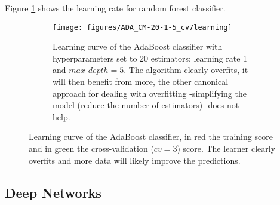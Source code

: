 \documentclass[11pt]{article}
\theoremstyle{definition}
\theoremstyle{remark}
\begin{document}
Figure \ref{fig:rf_learning} shows the learning rate for random forest classifier. 
\begin{figure}[H]
    \centering
    \begin{subfigure}[t]{.8\textwidth}
        \centering
        \texttt{[image: figures/ADA\_CM-20-1-5\_cv7learning]}
        \caption{Learning curve of the AdaBoost classifier with  hyperparameters set to 20 estimators; learning rate 1 and  $max\_depth=5$. The algorithm clearly overfits, it will then benefit from more, the other canonical approach for dealing with overfitting -simplifying the model (reduce the number of estimators)- does not help.}
    \end{subfigure}

    
    \caption{Learning curve of the AdaBoost classifier, in red the training score and in green the cross-validation ($cv=3$) score. The learner clearly overfits and more data will likely improve the predictions.} \label{fig:rf_learning}
\end{figure}

%




\subsection{Deep Networks}
\label{sse:resdeep}
\end{document}
